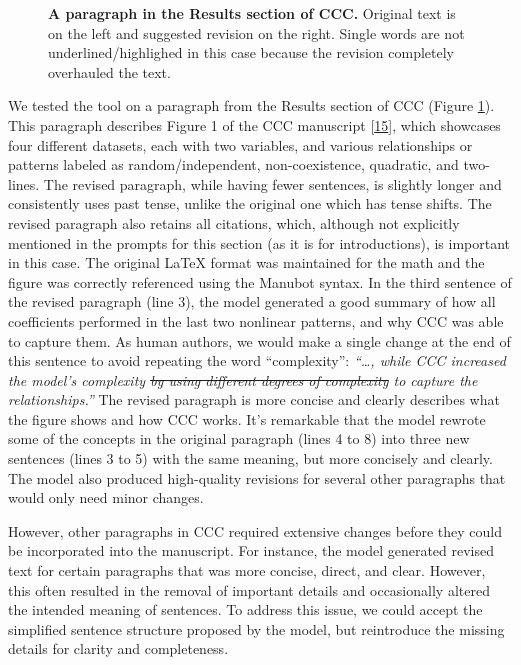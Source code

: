 \documentclass[
]{article}
\begin{document}
\begin{figure}
\hypertarget{fig:results:ccc}{%
\centering

\caption{\textbf{A paragraph in the Results section of CCC.}
Original text is on the left and suggested revision on the right.
Single words are not underlined/highlighed in this case because the revision completely overhauled the text.}\label{fig:results:ccc}
}
\end{figure}

We tested the tool on a paragraph from the Results section of CCC (Figure \ref{fig:results:ccc}).
This paragraph describes Figure 1 of the CCC manuscript {[}\protect\hyperlink{ref-eirYTTyk}{15}{]}, which showcases four different datasets, each with two variables, and various relationships or patterns labeled as random/independent, non-coexistence, quadratic, and two-lines.
The revised paragraph, while having fewer sentences, is slightly longer and consistently uses past tense, unlike the original one which has tense shifts.
The revised paragraph also retains all citations, which, although not explicitly mentioned in the prompts for this section (as it is for introductions), is important in this case.
The original LaTeX format was maintained for the math and the figure was correctly referenced using the Manubot syntax.
In the third sentence of the revised paragraph (line 3), the model generated a good summary of how all coefficients performed in the last two nonlinear patterns, and why CCC was able to capture them.
As human authors, we would make a single change at the end of this sentence to avoid repeating the word ``complexity'': \emph{``\ldots, while CCC increased the model's complexity \sout{by using different degrees of complexity} to capture the relationships.''}
The revised paragraph is more concise and clearly describes what the figure shows and how CCC works.
It's remarkable that the model rewrote some of the concepts in the original paragraph (lines 4 to 8) into three new sentences (lines 3 to 5) with the same meaning, but more concisely and clearly.
The model also produced high-quality revisions for several other paragraphs that would only need minor changes.

However, other paragraphs in CCC required extensive changes before they could be incorporated into the manuscript.
For instance, the model generated revised text for certain paragraphs that was more concise, direct, and clear.
However, this often resulted in the removal of important details and occasionally altered the intended meaning of sentences.
To address this issue, we could accept the simplified sentence structure proposed by the model, but reintroduce the missing details for clarity and completeness.
\end{document}
